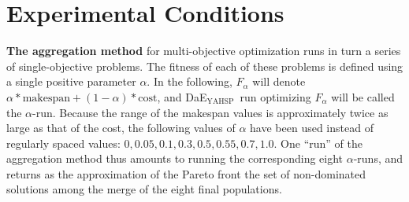 \documentclass{llncs}
\newcommand{\DAEYAHSP}{{\sc DaE$_{\text{YAHSP}}$}}
\renewcommand{\paragraph}[1]{{\bf #1}}
\begin{document}
% 

\section{Experimental Conditions}
\label{sec:condition}


\paragraph{The aggregation method} for multi-objective optimization runs in turn a series of single-objective problems. The fitness of each of these problems is defined using a single positive parameter $\alpha$. In the following, $F_{\alpha}$ will denote $\alpha * \mbox{makespan} + (1-\alpha) * \mbox{cost}$, and \DAEYAHSP\ run optimizing $F_{\alpha}$ will be called the $\alpha$-run. Because the range of the makespan values is approximately twice as large as that of the cost, the following values of $\alpha$ have been used instead of regularly spaced values: ${0, 0.05, 0.1, 0.3, 0.5, 0.55, 0.7, 1.0}$. One ``run'' of the aggregation method thus amounts to running the corresponding eight $\alpha$-runs, and returns as the approximation of the Pareto front the set of non-dominated solutions among the merge of the eight final populations.
\end{document}
